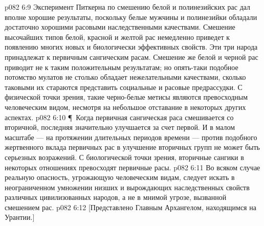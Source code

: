 \vs p082 6:9 Эксперимент Питкерна по смешению белой и полинезийских рас дал вполне хорошие результаты, поскольку белые мужчины и полинезийки обладали достаточно хорошими расовыми наследственными качествами. Смешение высочайших типов белой, красной и желтой рас немедленно приведет к появлению многих новых и биологически эффективных свойств. Эти три народа принадлежат к первичным сангическим расам. Смешение же белой и черной рас приводит не к таким положительным результатам; но опять\hyp{}таки подобное потомство мулатов не столько обладает нежелательными качествами, сколько таковыми их стараются представить социальные и расовые предрассудки. С физической точки зрения, такие черно\hyp{}белые метисы являются превосходным человеческим видом, несмотря на небольшое отставание в некоторых других аспектах.
\vs p082 6:10 \P\ Когда первичная сангическая раса смешивается со вторичной, последняя значительно улучшается за счет первой. И в малом масштабе --- на протяжении длительных периодов времени --- против подобного жертвенного вклада первичных рас в улучшение вторичных групп не может быть серьезных возражений. С биологической точки зрения, вторичные сангики в некоторых отношениях превосходят первичные расы.
\vs p082 6:11 Во всяком случае реальную опасность, угрожающую человеческим видам, следует искать в неограниченном умножении низших и вырождающих наследственных свойств различных цивилизованных народов, а не в мнимой угрозе, вызванной смешением рас.
\vs p082 6:12 [Представлено Главным Архангелом, находящимся на Урантии.]
